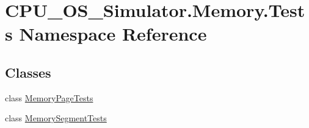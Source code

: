 \hypertarget{namespace_c_p_u___o_s___simulator_1_1_memory_1_1_tests}{}\section{C\+P\+U\+\_\+\+O\+S\+\_\+\+Simulator.\+Memory.\+Tests Namespace Reference}
\label{namespace_c_p_u___o_s___simulator_1_1_memory_1_1_tests}
\subsection*{Classes}
\begin{DoxyCompactItemize}
\item 
class \hyperlink{class_c_p_u___o_s___simulator_1_1_memory_1_1_tests_1_1_memory_page_tests}{Memory\+Page\+Tests}
\item 
class \hyperlink{class_c_p_u___o_s___simulator_1_1_memory_1_1_tests_1_1_memory_segment_tests}{Memory\+Segment\+Tests}
\end{DoxyCompactItemize}
